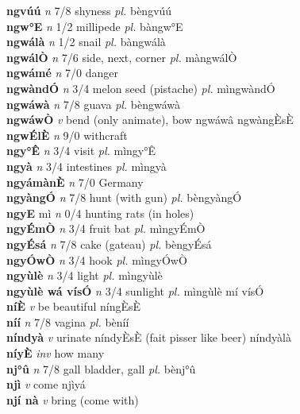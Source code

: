 \documentclass{article}
\begin{document}
{\bf ngvúú}  {\it n} 7/8 shyness {\it pl.} bèngvúú         \\ 
{\bf ngw°E}  {\it n} 1/2 millipede {\it pl.} bàngw°E         \\ 
{\bf ngwálà}  {\it n} 1/2 snail {\it pl.} bàngwálà         \\ 
{\bf ngwálÒ}  {\it n} 7/6 side, next, corner {\it pl.} màngwálÒ         \\ 
{\bf ngwámé}  {\it n} 7/0 danger         \\ 
{\bf ngwàndÓ}  {\it n} 3/4 melon seed (pistache) {\it pl.} mìngwàndÓ         \\ 
{\bf ngwáwà}  {\it n} 7/8 guava {\it pl.} bèngwáwà         \\ 
{\bf ngwáwÒ}  {\it v} bend (only animate), bow   ngwáwâ  ngwàngÈsÈ     \\ 
{\bf ngwÉlÈ}  {\it n} 9/0 withcraft         \\ 
{\bf ngy°Ê}  {\it n} 3/4 visit {\it pl.} mìngy°Ê         \\ 
{\bf ngyà}  {\it n} 3/4 intestines {\it pl.} mìngyà         \\ 
{\bf ngyámànÈ}  {\it n} 7/0 Germany         \\ 
{\bf ngyàngÓ}  {\it n} 7/8 hunt (with gun) {\it pl.} bèngyàngÓ         \\ 
{\bf ngyE} mì {\it n} 0/4 hunting rats (in holes)         \\ 
{\bf ngyÉmÒ}  {\it n} 3/4 fruit bat  {\it pl.} mìngyÉmÒ         \\ 
{\bf ngyÉsá}  {\it n} 7/8 cake (gateau) {\it pl.} bèngyÉsá         \\ 
{\bf ngyÓwÒ}  {\it n} 3/4 hook {\it pl.} mìngyÓwÒ         \\ 
{\bf ngyùlè}  {\it n} 3/4 light {\it pl.} mìngyùlè         \\ 
{\bf ngyùlè wá vísÓ}  {\it n} 3/4 sunlight {\it pl.} mìngùlè mí vísÓ         \\ 
{\bf níÈ}  {\it v} be beautiful     níngÈsÈ    \\ 
{\bf níí}  {\it n} 7/8 vagina {\it pl.} bèníí         \\ 
{\bf níndyà}  {\it v} urinate     níndyÈsÈ (fait pisser like beer) níndyàlà   \\ 
{\bf níyÈ}  {\it inv} how many         \\ 
{\bf nj°û}  {\it n} 7/8 gall bladder, gall {\it pl.} bènj°û         \\ 
{\bf njì}  {\it v} come   njìyá      \\ 
{\bf njí nà}  {\it v} bring (come with)         \\ 
\end{document}

